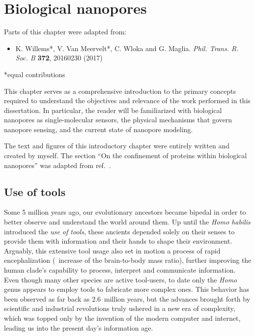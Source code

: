 \chapter{Biological nanopores}
%
\label{ch:nanopores}
%



%
%
\begin{shaded}
Parts of this chapter were adapted from:
%
\begin{itemize}
  \item K. Willems*, V. Van Meervelt*, C. Wloka and G. Maglia.
        \textit{Phil. Trans. R. Soc. B} \textbf{372}, 20160230 (2017) %
\end{itemize}
%
*equal contributions
%
\newpage
\end{shaded}
%
%

%
This chapter serves as a comprehensive introduction to the primary concepts required to understand the
objectives and relevance of the work performed in this dissertation. In particular, the reader will be
familiarized with biological nanopores as single-molecular sensors, the physical mechanisms that govern
nanopore sensing, and the current state of nanopore modeling.
%

%
The text and figures of this introductory chapter were entirely written and created by myself.
%
The section
%
``On the confinement of proteins within biological nanopores''
%
was adapted from ref.~\cite{Willems-VanMeervelt-2017}.



\clearpage

%
%
\section{Use of tools}
%

Some 5 million years ago, our evolutionary ancestors became bipedal in order to better observe and understand
the world around them. Up until the \textit{Homo habilis} introduced the \emph{use of tools}, these ancients
depended solely on their senses to provide them with information and their hands to shape their environment.
Arguably, this extensive tool usage also set in motion a process of rapid encephalization (\ie~increase of the
brain-to-body mass ratio), further improving the human clade's capability to process, interpret and
communicate information. Even though many other species are active tool-users, to date only the \textit{Homo}
genus appears to employ tools to fabricate more complex ones. This behavior has been observed as far back as
2.6~million years, but the advances brought forth by scientific and industrial revolutions truly ushered in a
new era of complexity, which was topped only by the invention of the modern computer and internet, leading us
into the present day's information age.

